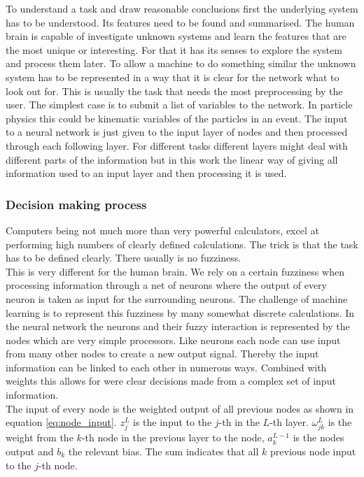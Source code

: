 To understand a task and draw reasonable conclusions first the underlying system has to be understood. Its features need to be found and summarised. The human brain is capable of investigate unknown systems and learn the features that are the most unique or interesting. For that it has its senses to explore the system and process them later. To allow a machine to do something similar the unknown system has to be represented in a way that it is clear for the network what to look out for. This is usually the task that needs the most preprocessing by the user. The simplest case is to submit a list of variables to the network. In particle physics this could be kinematic variables of the particles in an event.
The input to a neural network is just given to the input layer of nodes and then processed through each following layer. For different tasks different layers might deal with different parts of the information but in this work the linear way of giving all information used to an input layer and then processing it is used.

\subsubsection{Decision making process}

Computers being not much more than very powerful calculators, excel at performing high numbers of clearly defined calculations. The trick is that the task has to be defined clearly. There usually is no fuzziness.\\
This is very different for the human brain. We rely on a certain fuzziness when processing information through a net of neurons where the output of every neuron is taken as input for the surrounding neurons. The challenge of machine learning is to represent this fuzziness by many somewhat discrete calculations. In the neural network the neurons and their fuzzy interaction is represented by the nodes which are very simple processors. Like neurons each node can use input from many other nodes to create a new output signal. Thereby the input information can be linked to each other in numerous ways. Combined with weights this allows for were clear decisions made from a complex set of input information.\\
The input of every node is the weighted output of all previous nodes as shown in equation \eqref{eq:node_input}. $z_j^L$ is the input to the $j$-th in the $L$-th layer. $\omega_{jk}^L$ is the weight from the $k$-th node in the previous layer to the node, $a_k^{L-1}$ is the nodes output and $b_k$ the relevant bias. The sum indicates that all $k$ previous node input to the $j$-th node.

